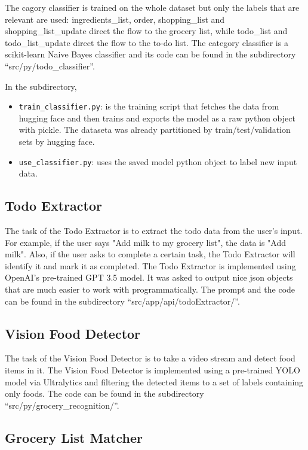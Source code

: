 \documentclass{article}
\begin{document}
The cagory classifier is trained on the whole dataset but only the labels that are relevant are used: ingredients\_list, order, shopping\_list and shopping\_list\_update direct the flow to the grocery list, while todo\_list and todo\_list\_update direct the flow to the to-do list. The category classifier is a scikit-learn Naive Bayes classifier and its code can be found in the subdirectory ``src/py/todo\_classifier''.


In the subdirectory,
\begin{itemize}
  \item \texttt{train\_classifier.py}: is the training script that fetches the data from hugging face and then trains and exports the model as a raw python object with pickle. The dataseta was already partitioned by train/test/validation sets by hugging face.
  \item \texttt{use\_classifier.py}: uses the saved model python object to label new input data.
\end{itemize}

\subsection*{\color{draculayellow}Todo Extractor}

The task of the Todo Extractor is to extract the todo data from the user's input. For example, if the user says "Add milk to my grocery list", the data is "Add milk". Also, if the user asks to complete a certain task, the Todo Extractor will identify it and mark it as completed. The Todo Extractor is implemented using OpenAI's pre-trained GPT 3.5 model. It was asked to output nice json objects that are much easier to work with programmatically. The prompt and the code can be found in the subdirectory ``src/app/api/todoExtractor/''.


\subsection*{\color{draculayellow}Vision Food Detector}

The task of the Vision Food Detector is to take a video stream and detect food items in it. The Vision Food Detector is implemented using a pre-trained YOLO model via Ultralytics and filtering the detected items to a set of labels containing only foods. The code can be found in the subdirectory ``src/py/grocery\_recognition/''.

\subsection*{\color{draculayellow}Grocery List Matcher}
\end{document}
